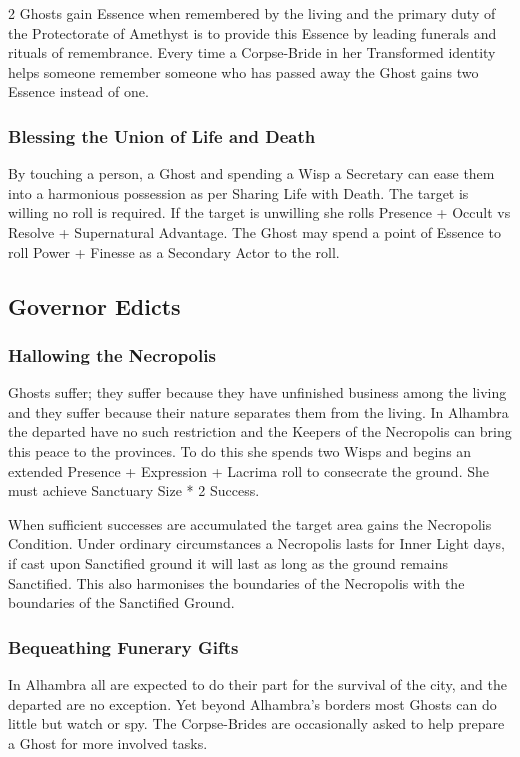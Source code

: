 \begin{multicols}{2}
Ghosts gain Essence when remembered by the living and the primary duty of the Protectorate of Amethyst is to provide this Essence by leading funerals and rituals of remembrance. Every time a Corpse-Bride in her Transformed identity helps someone remember someone who has passed away the Ghost gains two Essence instead of one. 

\subsubsection*{Blessing the Union of Life and Death}

By touching a person, a Ghost and spending a Wisp a Secretary can ease them into a harmonious possession as per Sharing Life with Death. The target is willing no roll is required. If the target is unwilling she rolls Presence + Occult vs Resolve + Supernatural Advantage. The Ghost may spend a point of Essence to roll Power + Finesse as a Secondary Actor to the roll. 
\subsection*{Governor Edicts}

\subsubsection*{Hallowing the Necropolis}

Ghosts suffer; they suffer because they have unfinished business among the living and they suffer because their nature separates them from the living. In Alhambra the departed have no such restriction and the Keepers of the Necropolis can bring this peace to the provinces. To do this she spends two Wisps and begins an extended Presence + Expression + Lacrima roll to consecrate the ground. She must achieve Sanctuary Size * 2 Success.

When sufficient successes are accumulated the target area gains the Necropolis Condition. Under ordinary circumstances a Necropolis lasts for Inner Light days, if cast upon Sanctified ground it will last as long as the ground remains Sanctified. This also harmonises the boundaries of the Necropolis with the boundaries of the Sanctified Ground. 

\subsubsection*{Bequeathing Funerary Gifts}

In Alhambra all are expected to do their part for the survival of the city, and the departed are no exception. Yet beyond Alhambra's borders most Ghosts can do little but watch or spy. The Corpse-Brides are occasionally asked to help prepare a Ghost for more involved tasks.


\end{multicols}
